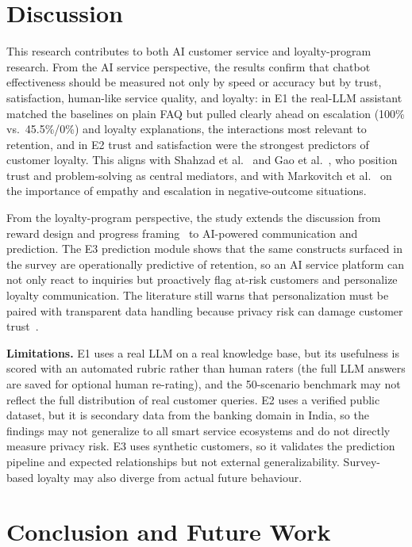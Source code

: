 \documentclass[runningheads]{llncs}
\begin{document}
\section{Discussion}\label{sec:discussion}

This research contributes to both AI customer service and loyalty-program research. From the AI service perspective, the results confirm that chatbot effectiveness should be measured not only by speed or accuracy but by trust, satisfaction, human-like service quality, and loyalty: in E1 the real-LLM assistant matched the baselines on plain FAQ but pulled clearly ahead on escalation (100\% vs.\ 45.5\%/0\%) and loyalty explanations, the interactions most relevant to retention, and in E2 trust and satisfaction were the strongest predictors of customer loyalty. This aligns with Shahzad et al.~\cite{ref05} and Gao et al.~\cite{ref08}, who position trust and problem-solving as central mediators, and with Markovitch et al.~\cite{ref11} on the importance of empathy and escalation in negative-outcome situations.

From the loyalty-program perspective, the study extends the discussion from reward design and progress framing~\cite{ref09,ref10} to AI-powered communication and prediction. The E3 prediction module shows that the same constructs surfaced in the survey are operationally predictive of retention, so an AI service platform can not only react to inquiries but proactively flag at-risk customers and personalize loyalty communication. The literature still warns that personalization must be paired with transparent data handling because privacy risk can damage customer trust~\cite{ref01,ref07}.

\noindent\textbf{Limitations.} E1 uses a real LLM on a real knowledge base, but its usefulness is scored with an automated rubric rather than human raters (the full LLM answers are saved for optional human re-rating), and the 50-scenario benchmark may not reflect the full distribution of real customer queries. E2 uses a verified public dataset, but it is secondary data from the banking domain in India, so the findings may not generalize to all smart service ecosystems and do not directly measure privacy risk. E3 uses synthetic customers, so it validates the prediction pipeline and expected relationships but not external generalizability. Survey-based loyalty may also diverge from actual future behaviour.

\section{Conclusion and Future Work}
\end{document}
